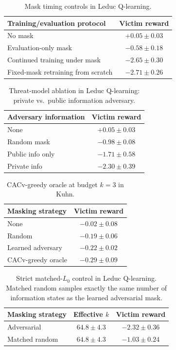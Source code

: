 \documentclass{article}
\begin{document}
\begin{table}[ht]
\centering
\caption{Mask timing controls in Leduc Q-learning.}
\begin{tabular}{lc}
\toprule
Training/evaluation protocol & Victim reward \\
\midrule
No mask & $+0.05 \pm 0.03$ \\
Evaluation-only mask & $-0.58 \pm 0.18$ \\
Continued training under mask & $-2.65 \pm 0.30$ \\
Fixed-mask retraining from scratch & $-2.71 \pm 0.26$ \\
\bottomrule
\end{tabular}
\end{table}

\begin{table}[ht]
\centering
\caption{Threat-model ablation in Leduc Q-learning: private vs.\ public information adversary.}
\begin{tabular}{lc}
\toprule
Adversary information & Victim reward \\
\midrule
None & $+0.05 \pm 0.03$ \\
Random mask & $-0.98 \pm 0.08$ \\
Public info only & $-1.71 \pm 0.58$ \\
Private info & $-2.30 \pm 0.39$ \\
\bottomrule
\end{tabular}
\end{table}

\begin{table}[ht]
\centering
\caption{CACv-greedy oracle at budget $k=3$ in Kuhn.}
\begin{tabular}{lc}
\toprule
Masking strategy & Victim reward \\
\midrule
None & $-0.02 \pm 0.08$ \\
Random & $-0.19 \pm 0.06$ \\
Learned adversary & $-0.22 \pm 0.02$ \\
CACv-greedy oracle & $\mathbf{-0.29 \pm 0.09}$ \\
\bottomrule
\end{tabular}
\end{table}

\begin{table}[ht]
\centering
\caption{Strict matched-$L_0$ control in Leduc Q-learning. Matched random samples exactly the same number of information states as the learned adversarial mask.}
\begin{tabular}{lcc}
\toprule
Masking strategy & Effective $k$ & Victim reward \\
\midrule
Adversarial & $64.8 \pm 4.3$ & $-2.32 \pm 0.36$ \\
Matched random & $64.8 \pm 4.3$ & $-1.03 \pm 0.24$ \\
\bottomrule
\end{tabular}
\end{table}
\end{document}
